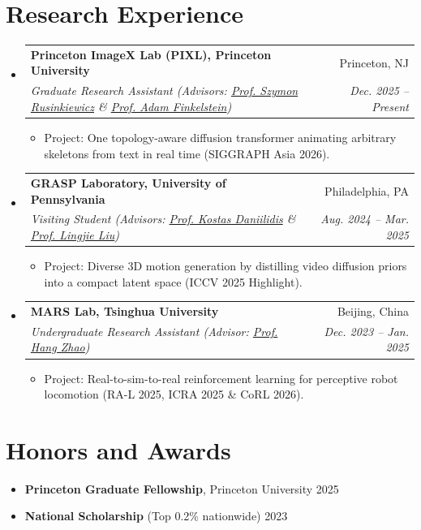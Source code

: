 \documentclass[letterpaper,11pt]{article}
\makeatletter
\newlength{\gapEntry}     \setlength{\gapEntry}{-2pt}     %
\newlength{\gapEntryEnd}  \setlength{\gapEntryEnd}{-6pt}  %
\newlength{\gapItem}      \setlength{\gapItem}{-2pt}      %
\newlength{\gapList}      \setlength{\gapList}{-4pt}      %
\newcommand{\link}[2]{\href{#1}{\textcolor{AcademicBlue}{#2}}} %
\newcommand{\resumeSubHeadingListStart}{\begin{itemize}[leftmargin=0.0in, label={}]}
\newcommand{\resumeSubHeadingListEnd}{\end{itemize}}
\newcommand{\resumeItemListStart}{\begin{itemize}[leftmargin=0.15in]}
\newcommand{\resumeItemListEnd}{\end{itemize}\vspace{\gapList}}
\newcommand{\resumeItem}[1]{%
  \item\small{{#1 \vspace{\gapItem}}}
}
\newcommand{\resumeHeading}[4]{%
  \vspace{\gapEntry}\item
    \begin{tabular*}{1.0\textwidth}[t]{l@{\extracolsep{\fill}}r}
      \textbf{#1} & \small #2 \\
      \textit{\small #3} & \textit{\small #4} \\
    \end{tabular*}\vspace{\gapEntryEnd}
}
\makeatother
\begin{document}
\section{Research Experience}
\resumeSubHeadingListStart
    \resumeHeading
      {Princeton ImageX Lab (PIXL), Princeton University}{Princeton, NJ}
      {Graduate Research Assistant \quad (Advisors: \link{https://www.cs.princeton.edu/~smr/}{Prof. Szymon Rusinkiewicz} \& \link{https://www.cs.princeton.edu/~af/}{Prof. Adam Finkelstein})}{Dec. 2025 -- Present}
    \resumeItemListStart
        \resumeItem{Project: One topology-aware diffusion transformer animating arbitrary skeletons from text in real time (SIGGRAPH Asia 2026).}
    \resumeItemListEnd

    \resumeHeading
      {GRASP Laboratory, University of Pennsylvania}{Philadelphia, PA}
      {Visiting Student \quad (Advisors: \link{https://www.cis.upenn.edu/~kostas/}{Prof. Kostas Daniilidis} \& \link{https://lingjie0206.github.io/}{Prof. Lingjie Liu})}{Aug. 2024 -- Mar. 2025}
    \resumeItemListStart
        \resumeItem{Project: Diverse 3D motion generation by distilling video diffusion priors into a compact latent space (ICCV 2025 Highlight).}
    \resumeItemListEnd

    \resumeHeading
      {MARS Lab, Tsinghua University}{Beijing, China}
      {Undergraduate Research Assistant \quad (Advisor: \link{https://hangzhaomit.github.io/}{Prof. Hang Zhao})}{Dec. 2023 -- Jan. 2025}
    \resumeItemListStart
        \resumeItem{Project: Real-to-sim-to-real reinforcement learning for perceptive robot locomotion (RA-L 2025, ICRA 2025 \& CoRL 2026).}
    \resumeItemListEnd
\resumeSubHeadingListEnd

\section{Honors and Awards}
\resumeItemListStart
    \resumeItem{\textbf{Princeton Graduate Fellowship}, Princeton University \hfill 2025}
    \resumeItem{\textbf{National Scholarship} (Top 0.2\% nationwide) \hfill 2023}
\resumeItemListEnd

\end{document}
